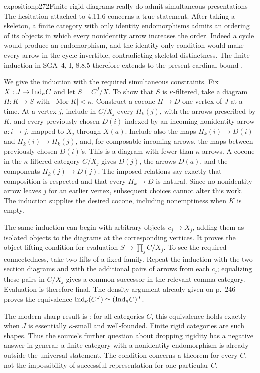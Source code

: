 \begin{dcomment}{exposition}{p272}{Finite rigid diagrams really do admit simultaneous presentations}
The hesitation attached to 4.11.6 concerns a true statement. After taking a skeleton, a finite category with only identity endomorphisms admits an ordering of its objects in which every nonidentity arrow increases the order. Indeed a cycle would produce an endomorphism, and the identity-only condition would make every arrow in the cycle invertible, contradicting skeletal distinctness. The finite induction in SGA~4, I, 8.8.5 therefore extends to the present cardinal bound \citep{SGA4I1972}.

We give the induction with the required simultaneous constraints. Fix $X:J\to\mathrm{Ind}_\kappa C$ and let $S=C^J/X$. To show that $S$ is $\kappa$-filtered, take a diagram $H:K\to S$ with $|\operatorname{Mor}K|<\kappa$. Construct a cocone $H\to D$ one vertex of $J$ at a time. At a vertex $j$, include in $C/X_j$ every $H_k(j)$, with the arrows prescribed by $K$, and every previously chosen $D(i)$ indexed by an incoming nonidentity arrow $a:i\to j$, mapped to $X_j$ through $X(a)$. Include also the maps $H_k(i)\to D(i)$ and $H_k(i)\to H_k(j)$, and, for composable incoming arrows, the maps between previously chosen $D(i)$'s. This is a diagram with fewer than $\kappa$ arrows. A cocone in the $\kappa$-filtered category $C/X_j$ gives $D(j)$, the arrows $D(a)$, and the components $H_k(j)\to D(j)$. The imposed relations say exactly that composition is respected and that every $H_k\to D$ is natural. Since no nonidentity arrow leaves $j$ for an earlier vertex, subsequent choices cannot alter this work. The induction supplies the desired cocone, including nonemptiness when $K$ is empty.

The same induction can begin with arbitrary objects $c_j\to X_j$, adding them as isolated objects to the diagrams at the corresponding vertices. It proves the object-lifting condition for evaluation $S\to\prod_j C/X_j$. To see the required connectedness, take two lifts of a fixed family. Repeat the induction with the two section diagrams and with the additional pairs of arrows from each $c_j$; equalizing these pairs in $C/X_j$ gives a common successor in the relevant comma category. Evaluation is therefore final. The density argument already given on p.~246 proves the equivalence $\mathrm{Ind}_\kappa(C^J)\simeq(\mathrm{Ind}_\kappa C)^J$.

The modern sharp result is \citet[Theorem~1.3]{Henry2025Ind}: for all categories $C$, this equivalence holds exactly when $J$ is essentially $\kappa$-small and well-founded. Finite rigid categories are such shapes. Thus the source's further question about dropping rigidity has a negative answer in general; a finite category with a nonidentity endomorphism is already outside the universal statement. The condition concerns a theorem for every $C$, not the impossibility of successful representation for one particular $C$.
\end{dcomment}


